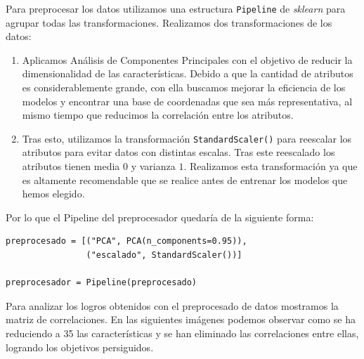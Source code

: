 \documentclass[size=a4, parskip=half, titlepage=false, toc=flat, toc=bib, 12pt]{scrartcl}
\begin{document}
Para preprocesar los datos utilizamos una estructura \verb|Pipeline| de \textit{sklearn} para agrupar todas las transformaciones. Realizamos dos transformaciones de los datos:
\begin{enumerate}

\item Aplicamos Análisis de Componentes Principales con el objetivo de reducir la dimensionalidad de las características. Debido a que la cantidad de atributos es considerablemente grande, con ella buscamos mejorar la eficiencia de los modelos y encontrar una base de coordenadas que sea más representativa, al mismo tiempo que reducimos la correlación entre los atributos.

\item Tras esto, utilizamos la transformación \verb|StandardScaler()| para reescalar los atributos para evitar datos con distintas escalas. Tras este reescalado los atributos tienen media $0$ y varianza $1$. Realizamos esta transformación ya que es altamente recomendable que se realice antes de entrenar los modelos que hemos elegido.

\end{enumerate}
Por lo que el Pipeline del preprocesador quedaría de la siguiente forma:
\begin{verbatim}
preprocesado = [("PCA", PCA(n_components=0.95)),
                ("escalado", StandardScaler())]

preprocesador = Pipeline(preprocesado)
\end{verbatim}

Para analizar los logros obtenidos con el preprocesado de datos mostramos la matriz de correlaciones.  En las siguientes imágenes podemos observar como se ha reduciendo a 35 las características y se han eliminado las correlaciones entre ellas, logrando los objetivos persiguidos.
\end{document}
